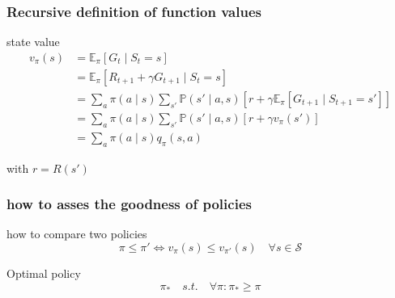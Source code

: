 \documentclass[dvipsnames,svgnames]{beamer}
\begin{document}
\begin{frame}
\frametitle{Recursive definition of function values}
\begin{block}{state value}
\begin{equation}
\begin{split}
v_{\pi}(s) &= \mathbb{E}_{\pi}[G_t\mid S_t =s]
\\&=\mathbb{E}_{\pi}[R_{t+1}+\gamma G_{t+1}\mid S_t =s]
\\& =\sum_{a }\pi(a \mid s) \sum_{s'}\mathbb{P}(s'\mid a,s)\left[r + \gamma \mathbb{E}_{\pi}\left[G_{t+1} \mid S_{t+1}=s' \right]\right]
\\& =\sum_{a }\pi(a \mid s) \sum_{s'}\mathbb{P}(s'\mid a,s)\left[r + \gamma v_{\pi}(s') \right]
\\&=\sum_{a }\pi(a \mid s)q_{\pi}(s,a)
\end{split}
\end{equation}
\end{block}

with $r=R(s')$
\end{frame}




\begin{frame}
\frametitle{how to asses the goodness of policies}
\begin{block}{how to compare two policies}
$$ \pi \leq \pi ' \iff  v_{\pi}(s) \leq v_{\pi'}(s) \quad \forall s \in \mathcal{S}
$$
\end{block}

\pause 

\begin{block}{Optimal policy}
$$ \pi_{*} \quad s.t. \quad \forall \pi : \pi_{*}\geq \pi $$
\end{block}
\end{frame}

\end{document}
